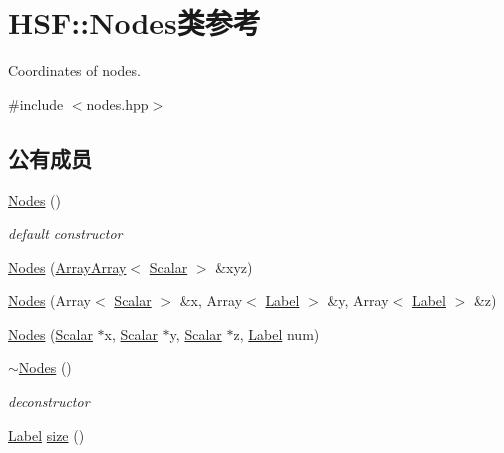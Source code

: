 \hypertarget{classHSF_1_1Nodes}{
\section{HSF::Nodes类参考}
\label{classHSF_1_1Nodes}
}


Coordinates of nodes.  


{\ttfamily \#include $<$nodes.hpp$>$}\subsection*{公有成员}
\begin{DoxyCompactItemize}
\item 
\hyperlink{classHSF_1_1Nodes_a4cf0a36ef0cbd1d2183e6f426289b3ef}{Nodes} ()
\begin{DoxyCompactList}\small\item\em default constructor \item\end{DoxyCompactList}\item 
\hyperlink{classHSF_1_1Nodes_a6c4e1453888f5fa3008d992d1f19c1b4}{Nodes} (\hyperlink{classHSF_1_1ArrayArray}{ArrayArray}$<$ \hyperlink{namespaceHSF_a7419497552ed1c5631a818b75eed1aec}{Scalar} $>$ \&xyz)
\item 
\hyperlink{classHSF_1_1Nodes_aa08a28dcddd6fdbc64fef3d3c7bfba82}{Nodes} (Array$<$ \hyperlink{namespaceHSF_a7419497552ed1c5631a818b75eed1aec}{Scalar} $>$ \&x, Array$<$ \hyperlink{namespaceHSF_ae65d72be782e989396ebe5ec6ae4c2b6}{Label} $>$ \&y, Array$<$ \hyperlink{namespaceHSF_ae65d72be782e989396ebe5ec6ae4c2b6}{Label} $>$ \&z)
\item 
\hyperlink{classHSF_1_1Nodes_a545e2813acfe02611c3ef8d659c8ce2f}{Nodes} (\hyperlink{namespaceHSF_a7419497552ed1c5631a818b75eed1aec}{Scalar} $\ast$x, \hyperlink{namespaceHSF_a7419497552ed1c5631a818b75eed1aec}{Scalar} $\ast$y, \hyperlink{namespaceHSF_a7419497552ed1c5631a818b75eed1aec}{Scalar} $\ast$z, \hyperlink{namespaceHSF_ae65d72be782e989396ebe5ec6ae4c2b6}{Label} num)
\item 
\hyperlink{classHSF_1_1Nodes_aad6cecbfe88532697dedfca221638d89}{$\sim$Nodes} ()
\begin{DoxyCompactList}\small\item\em deconstructor \item\end{DoxyCompactList}\item 
\hyperlink{namespaceHSF_ae65d72be782e989396ebe5ec6ae4c2b6}{Label} \hyperlink{classHSF_1_1Nodes_a8e3420be01fedbc5682e037631c28465}{size} ()

\end{DoxyCompactItemize}
